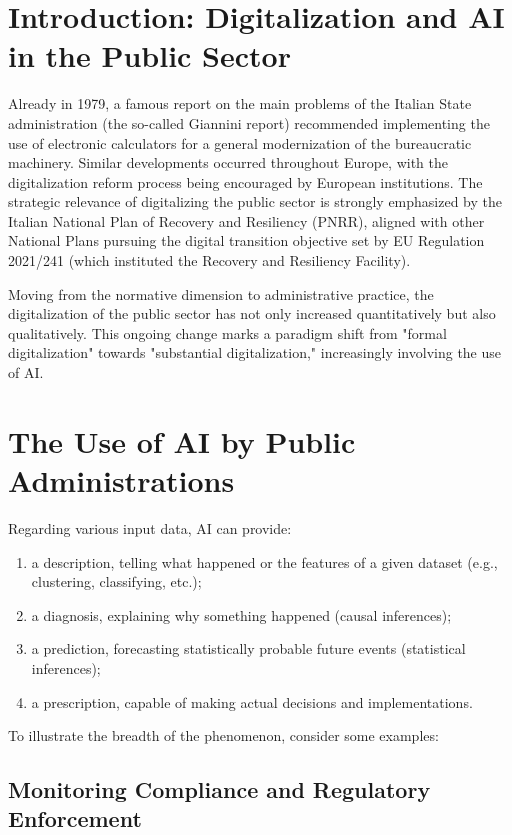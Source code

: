 \section{Introduction: Digitalization and AI in the Public Sector}
Already in 1979, a famous report on the main problems of the Italian State administration (the so-called Giannini report) recommended implementing the use of electronic calculators for a general modernization of the bureaucratic machinery. Similar developments occurred throughout Europe, with the digitalization reform process being encouraged by European institutions. The strategic relevance of digitalizing the public sector is strongly emphasized by the Italian National Plan of Recovery and Resiliency (PNRR), aligned with other National Plans pursuing the digital transition objective set by EU Regulation 2021/241 (which instituted the Recovery and Resiliency Facility).

Moving from the normative dimension to administrative practice, the digitalization of the public sector has not only increased quantitatively but also qualitatively. This ongoing change marks a paradigm shift from "formal digitalization" towards "substantial digitalization," increasingly involving the use of AI.

\section{The Use of AI by Public Administrations}

Regarding various input data, AI can provide:

\begin{enumerate}[label=\alph*)]
    \item a description, telling what happened or the features of a given dataset (e.g., clustering, classifying, etc.);
    \item a diagnosis, explaining why something happened (causal inferences);
    \item a prediction, forecasting statistically probable future events (statistical inferences);
    \item a prescription, capable of making actual decisions and implementations.
\end{enumerate}

To illustrate the breadth of the phenomenon, consider some examples:

\subsection{Monitoring Compliance and Regulatory Enforcement}

